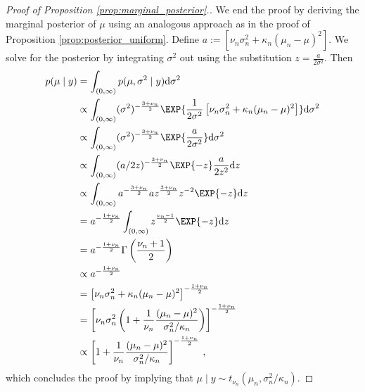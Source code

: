 \begin{proof}[Proof of Proposition \ref{prop:marginal_posterior}.]
We end the proof by deriving the marginal posterior of $\mu$ using an analogous approach as in the proof of Proposition \ref{prop:posterior_uniform}.
Define $a := \left[\nu_n\sigma_n^2 + \kappa_n(\mu_n - \mu)^2 \right]$. We solve for the posterior by integrating $\sigma^2$ out using the substitution $z = \frac{a}{2\sigma^2}$. Then
\begin{align*}
  p(\mu \mid y) &= \int_{(0, \infty)} p(\mu, \sigma^2 \mid y) \mathrm{d}\sigma^2\\
  &\propto \int_{(0, \infty)}(\sigma^2)^{-\frac{3 + \nu_n}{2}} \EXP{\frac{1}{2\sigma^2} \left[\nu_n \sigma_n^2 + \kappa_n(\mu_n - \mu)^2 \right]}\mathrm{d}\sigma^2\\
  &\propto \int_{(0, \infty)}(\sigma^2)^{-\frac{3 + \nu_n}{2}} \EXP{\frac{a}{2\sigma^2}}\mathrm{d}\sigma^2\\
  &\propto \int_{(0, \infty)}(a / 2z)^{-\frac{3 + \nu_n}{2}} \EXP{-z} \frac{a}{2 z^2} \mathrm{d}z\\
  &\propto \int_{(0, \infty)}a^{-\frac{3 + \nu_n}{2}}a z^{\frac{3 + \nu_n}{2}}z^{-2} \EXP{-z} \mathrm{d}z\\
  &= a^{-\frac{1 + \nu_n}{2}} \int_{(0, \infty)} z^{\frac{\nu_n - 1}{2}} \EXP{-z} \mathrm{d}z\\
  &= a^{-\frac{1 + \nu_n}{2}} \Gamma\left(\frac{\nu_n + 1}{2}\right)\\
  &\propto a^{-\frac{1 + \nu_n}{2}}\\
  &= \left[\nu_n \sigma_n^2 + \kappa_n(\mu_n - \mu)^2 \right]^{-\frac{1 + \nu_n}{2}}\\
  &= \left[\nu_n \sigma_n^2\left(1 + \frac{1}{\nu_n}\frac{(\mu_n - \mu)^2}{\sigma_n^2 / \kappa_n}\right) \right]^{-\frac{1 + \nu_n}{2}}\\
  &\propto \left[1 + \frac{1}{\nu_n}\frac{(\mu_n - \mu)^2}{\sigma_n^2 / \kappa_n} \right]^{-\frac{1 + \nu_n}{2}} \,,
\end{align*}
which concludes the proof by implying that $\mu \mid y \sim t_{\nu_n}(\mu_n, \sigma_n^2 / \kappa_n)$.
\end{proof}
